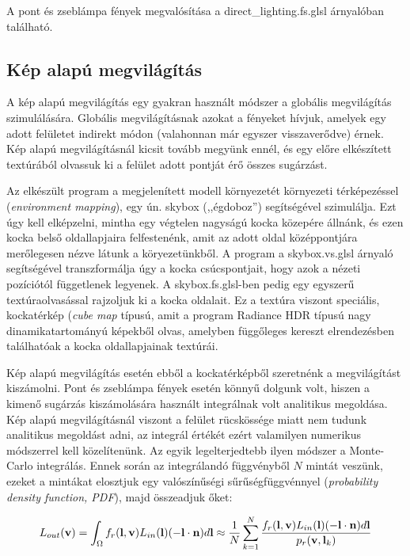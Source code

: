 A pont és zseblámpa fények megvalósítása a direct\_lighting.fs.glsl árnyalóban található.

\subsection{Kép alapú megvilágítás}

A kép alapú megvilágítás egy gyakran használt módszer a globális megvilágítás szimulálására. Globális megvilágításnak azokat a fényeket hívjuk, amelyek egy adott felületet indirekt módon (valahonnan már egyszer visszaverődve) érnek. Kép alapú megvilágításnál kicsit tovább megyünk ennél, és egy előre elkészített textúrából olvassuk ki a felület adott pontját érő összes sugárzást.

Az elkészült program a megjelenített modell környezetét környezeti térképezéssel (\textit{environment mapping}), egy ún. skybox (,,égdoboz'') segítségével szimulálja. Ezt úgy kell elképzelni, mintha egy végtelen nagyságú kocka közepére állnánk, és ezen kocka belső oldallapjaira felfestenénk, amit az adott oldal középpontjára merőlegesen nézve látunk a köryezetünkből. A program a skybox.vs.glsl árnyaló segítségével transzformálja úgy a kocka csúcspontjait, hogy azok a nézeti pozíciótól függetlenek legyenek. A skybox.fs.glsl-ben pedig egy egyszerű textúraolvasással rajzoljuk ki a kocka oldalait. Ez a textúra viszont speciális, kockatérkép (\textit{cube map} típusú, amit a program Radiance HDR típusú nagy dinamikatartományú képekből olvas, amelyben függőleges kereszt elrendezésben találhatóak a kocka oldallapjainak textúrái.

Kép alapú megvilágítás esetén ebből a kockatérképből szeretnénk a megvilágítást kiszámolni. Pont és zseblámpa fények esetén könnyű dolgunk volt, hiszen a kimenő sugárzás kiszámolására használt integrálnak volt analitikus megoldása. Kép alapú megvilágításnál viszont a felület rücskössége miatt nem tudunk analitikus megoldást adni, az integrál értékét ezért valamilyen numerikus módszerrel kell közelítenünk. Az egyik legelterjedtebb ilyen módszer a Monte-Carlo integrálás. Ennek során az integrálandó függvényből \(N\) mintát veszünk, ezeket a mintákat elosztjuk egy valószínűségi sűrűségfüggvénnyel (\textit{probability density function, PDF}), majd összeadjuk őket:

\[
L_{out}(\mathbf{v}) = \int_{\Omega} { f_r(\mathbf{l}, \mathbf{v}) L_{in}(\mathbf{l})(-\mathbf{l} \cdot \mathbf{n}) d\mathbf{l} } \approx { 1 \over N } \sum_{k=1}^{N} { { f_r(\mathbf{l}, \mathbf{v}) L_{in}(\mathbf{l})(-\mathbf{l} \cdot \mathbf{n}) d\mathbf{l} } \over { p_r(\mathbf{v}, \mathbf{l}_k) } }
\]


